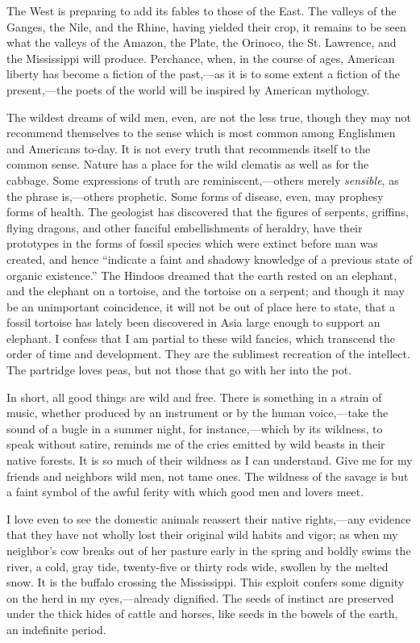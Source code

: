 \documentclass[twoside,openright,10pt]{memoir} %
\begin{document}
The West is preparing to add its fables to those of the East. The valleys of the Ganges, the Nile, and the Rhine, having yielded their crop, it remains to be seen what the valleys of the Amazon, the Plate, the Orinoco, the St. Lawrence, and the Mississippi will produce. Perchance, when, in the course of ages, American liberty has become a fiction of the past,—as it is to some extent a fiction of the present,—the poets of the world will be inspired by American mythology.

The wildest dreams of wild men, even, are not the less true, though they may not recommend themselves to the sense which is most common among Englishmen and Americans to-day. It is not every truth that recommends itself to the common sense. Nature has a place for the wild clematis as well as for the cabbage. Some expressions of truth are reminiscent,—others merely \emph{sensible}, as the phrase is,—others prophetic. Some forms of disease, even, may prophesy forms of health. The geologist has discovered that the figures of serpents, griffins, flying dragons, and other fanciful embellishments of heraldry, have their prototypes in the forms of fossil species which were extinct before man was created, and hence “indicate a faint and shadowy knowledge of a previous state of organic existence.” The Hindoos dreamed that the earth rested on an elephant, and the elephant on a tortoise, and the tortoise on a serpent; and though it may be an unimportant coincidence, it will not be out of place here to state, that a fossil tortoise has lately been discovered in Asia large enough to support an elephant. I confess that I am partial to these wild fancies, which transcend the order of time and development. They are the sublimest recreation of the intellect. The partridge loves peas, but not those that go with her into the pot.

In short, all good things are wild and free. There is something in a strain of music, whether produced by an instrument or by the human voice,—take the sound of a bugle in a summer night, for instance,—which by its wildness, to speak without satire, reminds me of the cries emitted by wild beasts in their native forests. It is so much of their wildness as I can understand. Give me for my friends and neighbors wild men, not tame ones. The wildness of the savage is but a faint symbol of the awful ferity with which good men and lovers meet.

I love even to see the domestic animals reassert their native rights,—any evidence that they have not wholly lost their original wild habits and vigor; as when my neighbor’s cow breaks out of her pasture early in the spring and boldly swims the river, a cold, gray tide, twenty-five or thirty rods wide, swollen by the melted snow. It is the buffalo crossing the Mississippi. This exploit confers some dignity on the herd in my eyes,—already dignified. The seeds of instinct are preserved under the thick hides of cattle and horses, like seeds in the bowels of the earth, an indefinite period.
\end{document}
